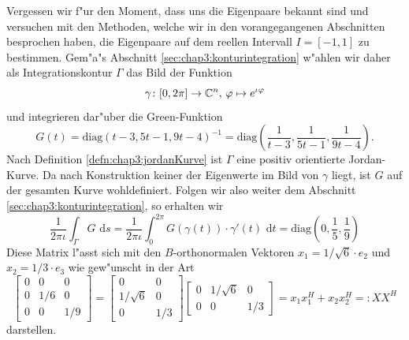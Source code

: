 Vergessen wir f"ur den Moment, dass uns die Eigenpaare bekannt sind und versuchen
mit den Methoden, welche wir in den vorangegangenen Abschnitten besprochen haben, die Eigenpaare auf dem reellen Intervall $I = [-1,1]$ zu bestimmen.
Gem"a"s Abschnitt \ref{sec:chap3:konturintegration} w"ahlen wir daher als Integrationskontur $\Gamma$ das Bild der Funktion
\begin{equation}\label{kurve}
\gamma\colon [0,2\pi]\to\mathbb{C}^n\text{, }\varphi\mapsto e^{\iota \varphi}
\end{equation}
und integrieren dar"uber die Green-Funktion
\[
G(t) = \text{diag}(t-3, 5t-1, 9t-4)^{-1}
=\text{diag}\left(\frac{1}{t-3}, \frac{1}{5t-1}, \frac{1}{9t-4}\right).
\]
Nach Definition \ref{defn:chap3:jordanKurve} ist $\Gamma$ eine positiv orientierte Jordan-Kurve.
Da nach Konstruktion keiner der Eigenwerte im Bild von
$\gamma$ liegt, ist $G$ auf der gesamten Kurve wohldefiniert.
Folgen wir also weiter dem Abschnitt \ref{sec:chap3:konturintegration}, so erhalten wir
\[
\frac{1}{2\pi\iota} \int_\Gamma G \text{ d}s =
\frac{1}{2\pi\iota}\int_0^{2\pi} G(\gamma(t))\cdot \gamma'(t)
\text{ d}t
= \text{diag}\left( 0, \frac{1}{5}, \frac{1}{9} \right)
\]
Diese Matrix l"asst sich mit den $B$-orthonormalen Vektoren $x_1 = 1/\sqrt6 \cdot e_2$
und $x_2 = 1/3\cdot e_3$ wie gew"unscht in der Art
\[
\begin{bmatrix} 0 & 0 & 0 \\ 0 & 1/6 & 0 \\ 0 & 0 & 1/9 \end{bmatrix}
= \begin{bmatrix} 0 & 0  \\ 1/\sqrt6 & 0  \\ 0 & 1/3  \end{bmatrix}
\begin{bmatrix} 0 & 1/\sqrt6 & 0 \\ 0 & 0 & 1/3 \end{bmatrix} = x_1 x_1^H + x_2 x_2^H =: X X^H
\]
darstellen.

